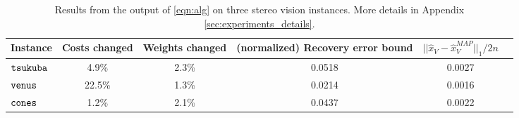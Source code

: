  \begin{table*}[ht]
     \centering
     \caption{Results from the output of \eqref{eqn:alg} on three stereo vision instances. More details in Appendix \ref{sec:experiments_details}.}
     \begin{tabular}{lccccc}
          Instance & Costs changed & Weights changed & (normalized) Recovery error bound & $||\hat{x}_V - \hat{x}^{MAP}_V||_1/2n$ \\
          \toprule
          ${\tt tsukuba}$ & 4.9\% & 2.3\% & 0.0518 & 0.0027\\
          ${\tt venus}$ & 22.5\% & 1.3\%  & 0.0214 & 0.0016\\
          ${\tt cones}$ & 1.2\% & 2.1\% & 0.0437 & 0.0022\\
          \bottomrule
     \end{tabular}
     \label{tbl:boundtable}
 \end{table*}
 
